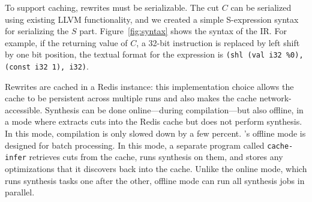 To support caching, rewrites must be serializable.
%
The cut $C$ can be serialized using existing LLVM functionality, and we
created a simple S-expression syntax for serializing the $S$ part.
%
Figure~\ref{fig:syntax} shows the syntax of the IR\@.
%
For example, if the returning value of $C$, a 32-bit instruction is
replaced by left shift by one bit position, the textual format for
the expression is \texttt{(shl (val i32 \%0), (const i32 1), i32)}.


Rewrites are cached in a Redis instance: this implementation choice
allows the cache to be persistent across multiple \minotaur{} runs and
also makes the cache network-accessible.
%
Synthesis can be done online---during compilation---but also
offline, in a mode where \minotaur{} extracts cuts into the Redis
cache but does not perform synthesis.
%
In this mode, compilation is only slowed down by a few percent.
%
\minotaur's offline mode is designed for batch processing.
%
In this mode, a separate program called \texttt{cache-infer} retrieves
cuts from the cache, runs synthesis on them, and stores any
optimizations that it discovers back into the cache.
%
Unlike the online mode, which runs synthesis tasks one after the
other, offline mode can run all synthesis jobs in parallel.



